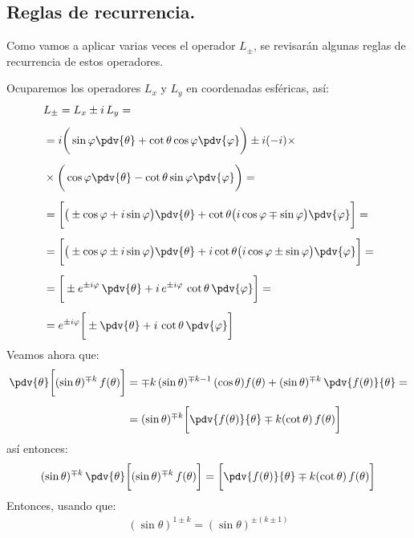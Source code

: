 \subsection{Reglas de recurrencia.}

Como vamos a aplicar varias veces el operador $L_{\pm}$, se revisarán algunas reglas de recurrencia de estos operadores.
\par
Ocuparemos los operadores $L_{x}$ y $L_{y}$ en coordenadas esféricas, así:
\begin{align}
\begin{aligned}[b]
&L_{\pm} = L_{x} \pm i \, L_{y} = \\[0.5em]
&= i \bigg( \sin \varphi \pdv{\theta} + \cot \theta \cos \varphi \pdv{\varphi} \bigg) \pm i (-i) \times \\[0.5em]
&\times \bigg( \cos \varphi \pdv{\theta} - \cot \theta \sin \varphi \pdv{\varphi} \bigg) = \\[0.5em]
&= \bigg[ \big( \pm \cos \varphi + i \sin \varphi \big) \pdv{\theta} + \cot \theta \big( i \cos \varphi \mp \sin \varphi \big) \pdv{\varphi} \bigg] = \\[0.5em]
&= \bigg[ \big( \pm \cos \varphi \pm i \sin \varphi \big) \pdv{\theta} + i \cot \theta \big( i \cos \varphi \pm \sin \varphi \big) \pdv{\varphi} \bigg] = \\[0.5em]
&= \bigg[ \pm e^{\pm i \varphi} \, \pdv{\theta} + i \, e^{\pm i \varphi} \, \cot \theta \, \pdv{\varphi} \bigg] = \\[0.5em]
&= e^{\pm i \varphi} \bigg[ \pm \pdv{\theta} + i \, \cot \theta \, \pdv{\varphi} \bigg]
\end{aligned}
\label{eq:ecuacion_10_159}
\end{align}
Veamos ahora que:
\begin{align*}
\pdv{\theta} \bigg[ (\sin \theta)^{\mp k} \, f(\theta) \bigg] &= \mp k \, (\sin \theta)^{\mp k-1} \, (\cos \theta) f(\theta) + (\sin \theta)^{\mp k} \, \pdv{f(\theta)}{\theta} = \\[0.5em]
&= (\sin \theta)^{\mp k} \bigg[ \pdv{f(\theta)}{\theta} \mp k (\cot \theta) \, f(\theta) \bigg]
\end{align*}
así entonces:
\begin{align*}
(\sin \theta)^{\mp k} \, \pdv{\theta} \bigg[ (\sin \theta)^{\mp k} \, f(\theta) \bigg] = \bigg[ \pdv{f(\theta)}{\theta} \mp k (\cot \theta) \, f(\theta) \bigg]
\end{align*}
Entonces, usando que:
\begin{align*}
(\sin \theta)^{1 \pm k} = (\sin \theta)^{\pm (k \pm 1)}
\end{align*}
